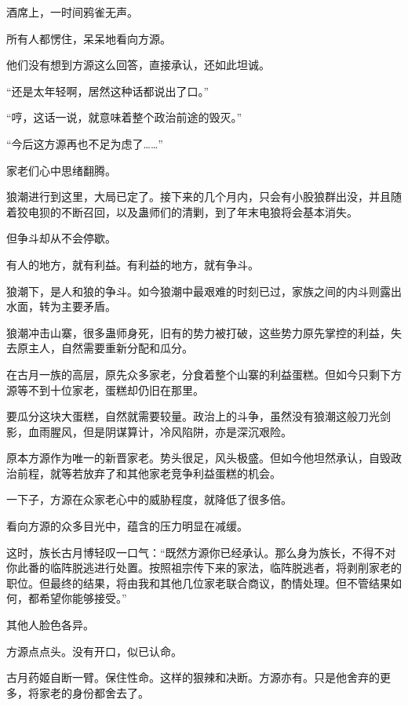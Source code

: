
\begin{this_body}



酒席上，一时间鸦雀无声。

所有人都愣住，呆呆地看向方源。

他们没有想到方源这么回答，直接承认，还如此坦诚。

“还是太年轻啊，居然这种话都说出了口。”

“哼，这话一说，就意味着整个政治前途的毁灭。”

“今后这方源再也不足为虑了……”

家老们心中思绪翻腾。

狼潮进行到这里，大局已定了。接下来的几个月内，只会有小股狼群出没，并且随着狡电狈的不断召回，以及蛊师们的清剿，到了年末电狼将会基本消失。

但争斗却从不会停歇。

有人的地方，就有利益。有利益的地方，就有争斗。

狼潮下，是人和狼的争斗。如今狼潮中最艰难的时刻已过，家族之间的内斗则露出水面，转为主要矛盾。

狼潮冲击山寨，很多蛊师身死，旧有的势力被打破，这些势力原先掌控的利益，失去原主人，自然需要重新分配和瓜分。

在古月一族的高层，原先众多家老，分食着整个山寨的利益蛋糕。但如今只剩下方源等不到十位家老，蛋糕却仍旧在那里。

要瓜分这块大蛋糕，自然就需要较量。政治上的斗争，虽然没有狼潮这般刀光剑影，血雨腥风，但是阴谋算计，冷风陷阱，亦是深沉艰险。

原本方源作为唯一的新晋家老。势头很足，风头极盛。但如今他坦然承认，自毁政治前程，就等若放弃了和其他家老竞争利益蛋糕的机会。

一下子，方源在众家老心中的威胁程度，就降低了很多倍。

看向方源的众多目光中，蕴含的压力明显在减缓。

这时，族长古月博轻叹一口气：“既然方源你已经承认。那么身为族长，不得不对你此番的临阵脱逃进行处置。按照祖宗传下来的家法，临阵脱逃者，将剥削家老的职位。但最终的结果，将由我和其他几位家老联合商议，酌情处理。但不管结果如何，都希望你能够接受。”

其他人脸色各异。

方源点点头。没有开口，似已认命。

古月药姬自断一臂。保住性命。这样的狠辣和决断。方源亦有。只是他舍弃的更多，将家老的身份都舍去了。


\end{this_body}
